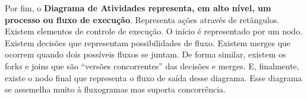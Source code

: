 \documentclass[12pt, a4paper]{article}
\newcommand{\tb}[1]{\textbf{#1}}
\newcommand{\quotes}[1]{``#1''}
\begin{document}
    Por fim, o \tb{Diagrama de Atividades representa, em alto nível, um processo ou fluxo de execução}. Representa ações através de retângulos. Existem elementos de controle de execução. O início é representado por um nodo. Existem decisões que representam possibilidades de fluxo. Existem merges que ocorrem quando dois possíveis fluxos se juntam. De forma similar, existem os forks e joins que são \quotes{versões concorrentes} das decisões e merges. E, finalmente, existe o nodo final que representa o fluxo de saída desse diagrama. Esse diagrama se assemelha muito à fluxogramas mas suporta concorrência.
    
\end{document}
